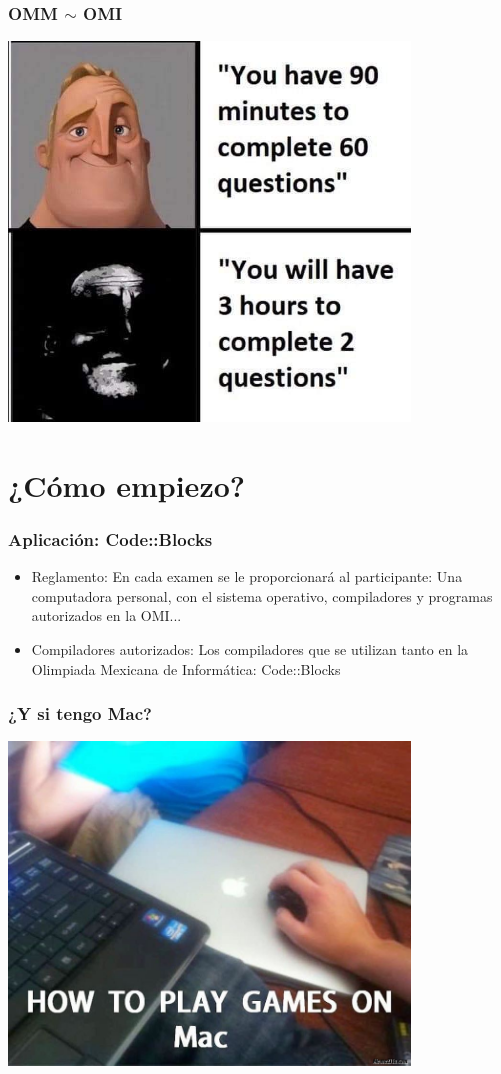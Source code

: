 \documentclass{beamer}
\begin{document}
\begin{frame}
  \frametitle{OMM $\sim$ OMI}
	\begin{center}
		\includegraphics[width=0.8\textwidth]{img/memingo.jpg}
	\end{center}
\end{frame}

\section{¿Cómo empiezo?}

\begin{frame}
  \frametitle{Aplicación: Code::Blocks}
	\begin{itemize}
		\item Reglamento: En cada examen se le proporcionará al participante: Una computadora personal, con el sistema operativo, compiladores y programas autorizados en la OMI...
		\item Compiladores autorizados: Los compiladores que se utilizan tanto en la Olimpiada Mexicana de Informática: Code::Blocks
	\end{itemize}
\end{frame}

\begin{frame}
  \frametitle{¿Y si tengo Mac?}
	\begin{center}
		\includegraphics[width=0.8\textwidth]{img/mac.jpg}
	\end{center}
\end{frame}
\end{document}
